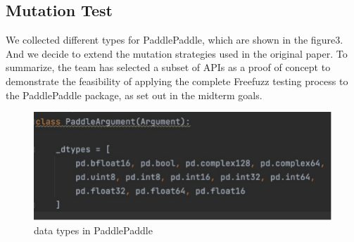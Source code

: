 \documentclass[sigconf]{acmart}
\begin{document}
\subsection{Mutation Test}
We collected different types for PaddlePaddle, which are shown in the figure3. 
And we decide to extend the mutation strategies used in the original paper.
To summarize, the team has selected a subset of APIs as a proof of concept to 
demonstrate the feasibility of applying the complete Freefuzz testing process to the PaddlePaddle package, 
as set out in the midterm goals.
\begin{figure}[h]
  \centering
  \includegraphics[width=\linewidth]{3.png}
  \caption{data types in PaddlePaddle}
\end{figure}
\end{document}
